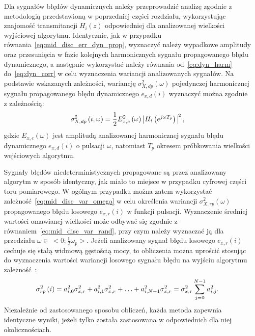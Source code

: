 Dla sygnałów błędów dynamicznych należy przeprowadzić analizę zgodnie z metodologią przedstawioną w poprzedniej części rozdziału, wykorzystując znajomość transmitancji $H_{i}(z)$ odpowiedniej dla analizowanej wielkości wyjściowej algorytmu. Identycznie, jak w przypadku równania~\eqref{eq:mid_disc_err_dyn_prop}, wyznaczyć należy wypadkowe amplitudy oraz przesunięcia w fazie kolejnych harmonicznych sygnału propagowanego błędu dynamicznego, a następnie wykorzystać należy równania od~\eqref{eq:dyn_harm} do~\eqref{eq:dyn_corr} w celu wyznaczenia wariancji analizowanych sygnałów. Na podstawie wskazanych zależności, wariancję $\sigma_{X,dp}^{2}(\omega)$ pojedynczej harmonicznej sygnału propagowanego błędu dynamicznego $e_{x,d}(i)$ wyznaczyć można zgodnie z zależnością:
\begin{equation}
\sigma_{X,dp}^{2} \left(i, \omega\right) = \frac{1}{2} E_{x,e}^{2} \left(\omega\right) \left| H_{i} \left(e^{j\omega T_{p}}\right) \right|^{2} \label{eq:alg_outvar_dyn},
\end{equation}
gdzie $E_{x,e}(\omega)$ jest amplitudą analizowanej harmonicznej sygnału błędu dynamicznego $e_{x,d}(i)$ o pulsacji $\omega$, natomiast $T_{p}$ okresem próbkowania wielkości wejściowych algorytmu.

Sygnały błędów niedeterministycznych propagowane są przez analizowany algorytm w sposób identyczny, jak miało to miejsce w przypadku cyfrowej części toru pomiarowego. W ogólnym przypadku można zatem wykorzystać zależność~\eqref{eq:mid_disc_var_omega} w celu określenia wariancji $\sigma_{X,rp}^{2}(\omega)$ propagowanego błędu losowego $e_{x,r}(i)$ w funkcji pulsacji. Wyznaczenie średniej wartości omawianej wielkości może odbywać się zgodnie z równaniem~\eqref{eq:mid_disc_var_rand}, przy czym należy wyznaczać ją dla przedziału $\omega \in~<0; \frac{1}{2} \omega_{p}>$. Jeżeli analizowany sygnał błędu losowego $e_{x,r}(i)$ cechuje się stałą widmową gęstością mocy, to obliczenia można uprościć stosując do wyznaczenia wartości wariancji losowego sygnału błędu na wyjściu algorytmu zależność~\cite{jakubiec_system}:
\begin{equation}
\sigma_{rp}^{2} \left(i\right) = a_{i, 0}^{2} \sigma_{x,r}^{2} + a_{i, 1}^{2} \sigma_{x,r}^{2} + \hdots + a_{i, N-1}^{2} \sigma_{x,r}^{2} = \sigma_{x,r}^{2} \sum _{j=0} ^{N-1} {a_{i, j}^{2}} \label{eq:alg_outvar_rand}.
\end{equation}
Niezależnie od zastosowanego sposobu obliczeń, każda metoda zapewnia identyczne wyniki, jeżeli tylko została zastosowana w odpowiednich dla niej okolicznościach.

